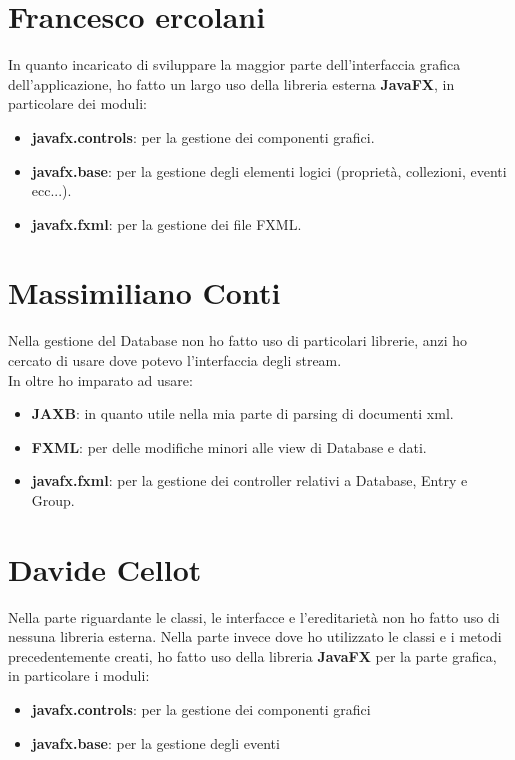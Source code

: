 \documentclass[a4paper,12pt]{report}
\begin{document}
\section*{Francesco ercolani}
In quanto incaricato di sviluppare la maggior parte dell'interfaccia grafica dell'applicazione, ho fatto un largo uso della libreria esterna \textbf{JavaFX}, in particolare dei moduli:
\begin{itemize}
    \item \textbf{javafx.controls}: per la gestione dei componenti grafici.
    \item \textbf{javafx.base}: per la gestione degli elementi logici (proprietà, collezioni, eventi ecc...).
    \item \textbf{javafx.fxml}: per la gestione dei file FXML.
\end{itemize}

\section*{Massimiliano Conti}
Nella gestione del Database non ho fatto uso di particolari librerie, anzi ho cercato di usare dove potevo l'interfaccia degli stream.\\
In oltre ho imparato ad usare:
\begin{itemize}
    \item \textbf{JAXB}: in quanto utile nella mia parte di parsing di documenti xml.
    \item \textbf{FXML}: per delle modifiche minori alle view di Database e dati.
    \item \textbf{javafx.fxml}: per la gestione dei controller relativi a Database, Entry e Group.
\end{itemize}

\section*{Davide Cellot}
Nella parte riguardante le classi, le interfacce e l’ereditarietà non ho fatto uso di nessuna libreria esterna. Nella parte invece dove ho utilizzato le classi e i metodi precedentemente creati, ho fatto uso della libreria \textbf{JavaFX} per la parte grafica, in particolare i moduli:\\
\begin{itemize}
    \item \textbf{javafx.controls}: per la gestione dei componenti grafici
    \item \textbf{javafx.base}: per la gestione degli eventi
\end{itemize}
\end{document}
